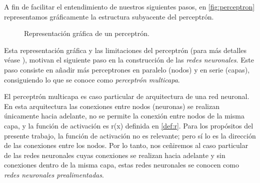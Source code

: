 \documentclass[12pt, a4paper, twoside]{book}
\numberwithin{equation}{section}
\theoremstyle{definition}
\theoremstyle{remark}
\theoremstyle{plain}
\begin{document}
	A fin de facilitar el entendimiento de nuestros siguientes pasos, 
	en \autoref{fig:perceptron} representamos gráficamente la estructura 
	subyacente del perceptrón.
	\begin{figure}[!htbp]
		\centering
		\caption{Representación gráfica de un perceptrón.}
		\label{fig:perceptron}
	\end{figure}
	
	
	
	Esta representación gráfica y las limitaciones del perceptrón (para 
	más detalles véase \cite{Perceptron-Convergencia}), motivan el 
	siguiente paso en la 
	construcción de las \emph{redes neuronales}. Este paso consiste en 
	añadir más perceptrones en paralelo (nodos) y en serie (capas), 
	consiguiendo lo que se conoce como \emph{perceptrón multicapa}.

	El perceptrón multicapa es caso particular de arquitectura de una red 
	neuronal. En esta arquitectura las conexiones entre nodos (neuronas) 
	se realizan únicamente hacia adelante, no se permite la conexión 
	entre nodos de la misma capa, y la función de activación es 
	r(x) definida en \ref{def:r}. Para los propósitos del presente 
	trabajo, la función de activación no es relevante; pero sí lo es la 
	dirección de las conexiones entre los nodos. Por lo tanto, nos 
	ceñiremos al caso particular de las redes neuronales cuyas conexiones
	se realizan hacia adelante y sin conexiones dentro de la misma capa, 
	estas redes neuronales se conocen como \emph{redes neuronales 
	prealimentadas}. 
	
\end{document}
